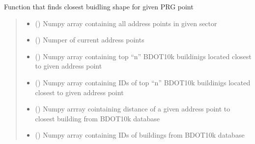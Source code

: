 \documentclass[letterpaper,10pt,english]{sphinxmanual}
\begin{document}
\begin{fulllineitems}
\label{\detokenize{geo_utilities:geo_utilities.gen_fin_bubds_ids}}
\pysigstartsignatures
{}
\pysigstopsignatures
\sphinxAtStartPar
Function that finds closest buidling shape for given PRG point
\begin{quote}\begin{description}
\begin{itemize}
\item {} 
\sphinxAtStartPar
{} () \textendash{} Numpy array containing all address points in given sector

\item {} 
\sphinxAtStartPar
{} () \textendash{} Numper of current address points

\item {} 
\sphinxAtStartPar
{} () \textendash{} Numpy array containing top “n” BDOT10k buildinigs located closest to given address point

\item {} 
\sphinxAtStartPar
{} () \textendash{} Numpy array containing IDs of top “n” BDOT10k buildinigs located closest to given address point

\item {} 
\sphinxAtStartPar
{} () \textendash{} Numpy arrray cointaining distance of a given address point to closest building from BDOT10k
database

\item {} 
\sphinxAtStartPar
{} () \textendash{} Numpy array containing IDs of buildings from BDOT10k database


\end{itemize}
\end{description}
\end{quote}
\end{fulllineitems}
\end{document}
